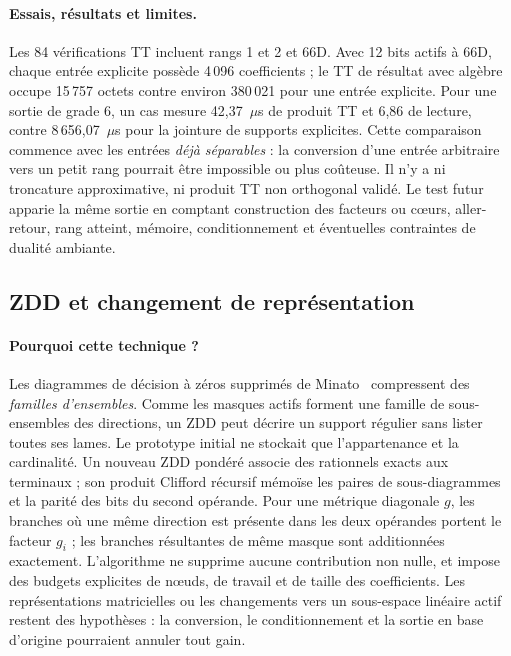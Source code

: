 \documentclass[11pt,a4paper]{article}
\begin{document}
\paragraph{Essais, résultats et limites.}
Les 84 vérifications TT incluent rangs 1 et 2 et 66D. Avec 12 bits actifs
à 66D, chaque entrée explicite possède 4\,096 coefficients ; le TT de
résultat avec algèbre occupe 15\,757 octets contre environ 380\,021
pour une entrée explicite. Pour une sortie de grade 6, un cas mesure
42,37~\(\mu\)s de produit TT et 6,86 de lecture, contre
8\,656,07~\(\mu\)s pour la jointure de supports explicites.
Cette comparaison commence avec les entrées \emph{déjà séparables} :
la conversion d'une entrée arbitraire vers un petit rang pourrait être
impossible ou plus coûteuse. Il n'y a ni troncature approximative, ni produit
TT non orthogonal validé. Le test futur apparie la même sortie en comptant
construction des facteurs ou cœurs, aller-retour, rang atteint, mémoire,
conditionnement et éventuelles contraintes de dualité ambiante.

\subsection{ZDD et changement de représentation}
\paragraph{Pourquoi cette technique ?}
Les diagrammes de décision à zéros supprimés de Minato~\cite{minato}
compressent des \emph{familles d'ensembles}. Comme les masques actifs
forment une famille de sous-ensembles des directions, un ZDD peut décrire
un support régulier sans lister toutes ses lames. Le prototype initial
ne stockait que l'appartenance et la cardinalité. Un nouveau ZDD pondéré
associe des rationnels exacts aux terminaux ; son produit Clifford récursif
mémoïse les paires de sous-diagrammes et la parité des bits du second
opérande. Pour une métrique diagonale $g$, les branches où une même
direction est présente dans les deux opérandes portent le facteur $g_i$ ;
les branches résultantes de même masque sont additionnées exactement.
L'algorithme ne supprime aucune contribution non nulle, et impose des
budgets explicites de nœuds, de travail et de taille des coefficients.
Les représentations matricielles ou les
changements vers un sous-espace linéaire actif restent des hypothèses :
la conversion, le conditionnement et la sortie en base d'origine pourraient
annuler tout gain.
\end{document}
